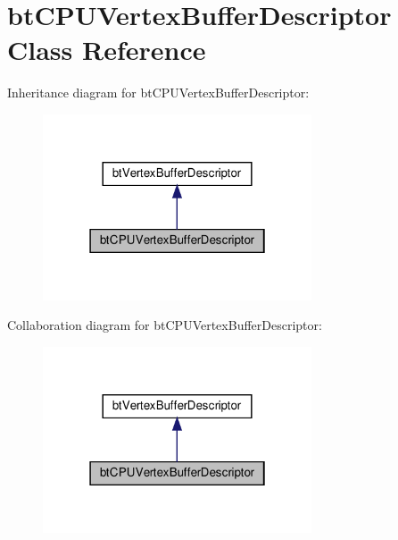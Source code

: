 \hypertarget{classbtCPUVertexBufferDescriptor}{}\section{bt\+C\+P\+U\+Vertex\+Buffer\+Descriptor Class Reference}
\label{classbtCPUVertexBufferDescriptor}


Inheritance diagram for bt\+C\+P\+U\+Vertex\+Buffer\+Descriptor\+:
\nopagebreak
\begin{figure}[H]
\begin{center}
\leavevmode
\includegraphics[width=226pt]{classbtCPUVertexBufferDescriptor__inherit__graph}
\end{center}
\end{figure}


Collaboration diagram for bt\+C\+P\+U\+Vertex\+Buffer\+Descriptor\+:
\nopagebreak
\begin{figure}[H]
\begin{center}
\leavevmode
\includegraphics[width=226pt]{classbtCPUVertexBufferDescriptor__coll__graph}
\end{center}
\end{figure}
